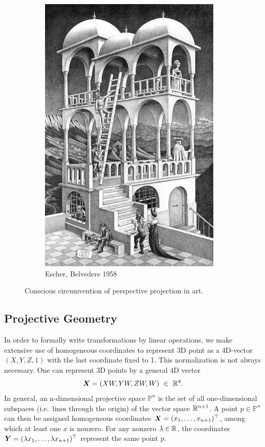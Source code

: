 \begin{figure}[h]
\begin{subfigure}[b]{0.42\textwidth}
	\includegraphics[width=\textwidth]{assets/img/escher_belvedere.jpg}
	\caption{Escher, Belvedere 1958}%
	\label{fig:escher_belvedere}
\end{subfigure}
\caption{Conscious circumvention of perspective projection in art.}%
\end{figure}


\subsection{Projective Geometry}%
\label{sub:projective_geometry}


In order to formally write transformations by linear operations,
we make extensive use of homogeneous coordinates to represent
3D point as a 4D-vector $(X,Y,Z,1)$ with the last coordinate fixed to 1.
This normalization is not always necessary. One can represent 3D points
by a general 4D vector
\[
	\bm{X} = (XW, YW, ZW, W)\ \in\ \mathbb{R}^4.
\]
In general, an n-dimensional projective space $\mathbb{P}^n$
is the set of all one-dimensional subspaces (i.e.\ lines through the origin)
of the vector space $\mathbb{R}^{n+1}$.
A point $p \in \mathbb{P}^n$ can then be assigned homogeneous coordinates
$\bm{X} = (x_1, \ldots, x_{n+1})^{\top}$, among which at least one $x$ is nonzero.
For any nonzero $\lambda \in \mathbb{R}$, the coordinates
$\bm{Y} = (\lambda x_1, \ldots, \lambda x_{n+1})^{\top}$
represent the same point $p$.


